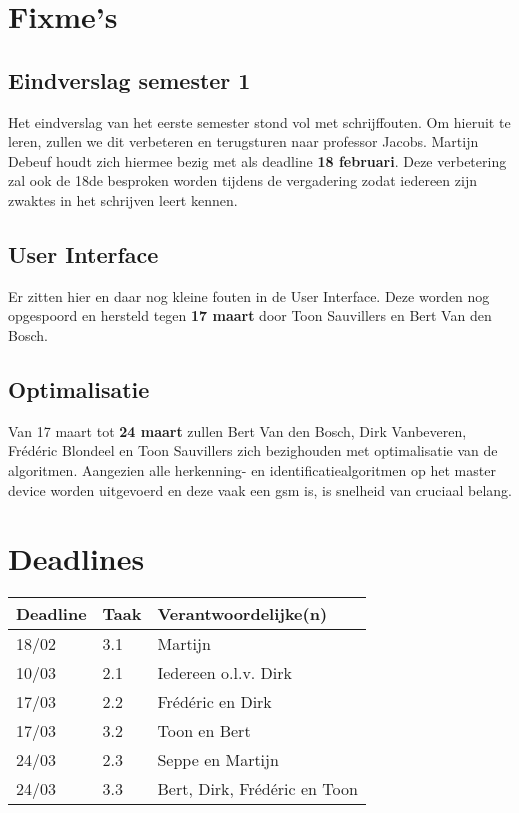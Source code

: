 \documentclass[a4paper,11pt]{article}
\begin{document}
\section{Fixme's}
\subsection{Eindverslag semester 1}
Het eindverslag van het eerste semester stond vol met schrijffouten. Om hieruit te leren, zullen we dit verbeteren en terugsturen naar professor Jacobs. Martijn Debeuf houdt zich hiermee bezig met als deadline {\bf 18 februari}. Deze verbetering zal ook de 18de besproken worden tijdens de vergadering zodat iedereen zijn zwaktes in het schrijven leert kennen.

\subsection{User Interface}
Er zitten hier en daar nog kleine fouten in de User Interface. Deze worden nog opgespoord en hersteld tegen {\bf 17 maart} door Toon Sauvillers en Bert Van den Bosch.

\subsection {Optimalisatie}
Van 17 maart tot {\bf 24 maart} zullen Bert Van den Bosch, Dirk Vanbeveren, Frédéric Blondeel en Toon Sauvillers zich bezighouden met optimalisatie van de algoritmen. Aangezien alle herkenning- en identificatiealgoritmen op het master device worden uitgevoerd en deze vaak een gsm is, is snelheid van cruciaal belang.

\section{Deadlines}
\begin{tabular}{| l | l | l |}
\hline
Deadline & Taak & Verantwoordelijke(n) \\
\hline
18/02 & 3.1 & Martijn \\
10/03 & 2.1 & Iedereen o.l.v. Dirk \\
17/03 & 2.2 & Frédéric en Dirk \\
17/03 & 3.2 & Toon en Bert \\
24/03 & 2.3 & Seppe en Martijn \\
24/03 & 3.3 & Bert, Dirk, Frédéric en Toon \\
\hline
\end{tabular}
\end{document}
